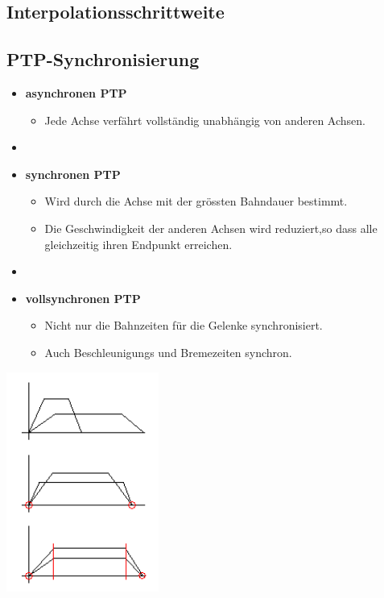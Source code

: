 \subsection{Interpolationsschrittweite }
\subsection{PTP-Synchronisierung}
\begin{minipage}{0.7\linewidth}
    \begin{itemize}
        \item  \textbf{asynchronen PTP}
        \begin{itemize}
            \item  Jede Achse verfährt vollständig unabhängig von anderen Achsen.
        \end{itemize}
    \item[]
        \item  \textbf{synchronen PTP }
        \begin{itemize}
            \item  Wird durch die Achse mit der grössten Bahndauer bestimmt.
            \item Die Geschwindigkeit der anderen Achsen wird reduziert,so dass alle gleichzeitig ihren Endpunkt erreichen.
        \end{itemize}
    \item[]
        \item  \textbf{vollsynchronen PTP }
        \begin{itemize}
            \item  Nicht nur die Bahnzeiten für die Gelenke synchronisiert.
            \item Auch Beschleunigungs und Bremezeiten synchron.
        \end{itemize}
    \end{itemize}
\end{minipage}
\begin{minipage}{6cm}
    \includegraphics[width=5cm]{./bilder/synchron}
\end{minipage}
\newline
